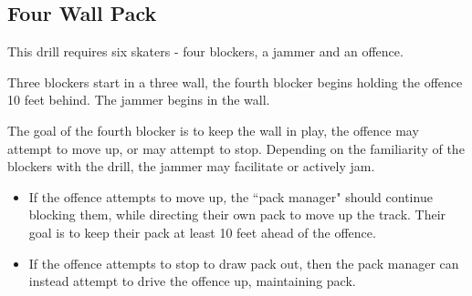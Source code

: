 \subsection*{Four Wall Pack}
\label{drill:four_wall/pack}

This drill requires six skaters - four blockers, a jammer and an offence.

Three blockers start in a three wall, the fourth blocker begins holding the offence 10 feet behind.
The jammer begins in the wall. 


The goal of the fourth blocker is to keep the wall in play, the offence may attempt to move up, or may attempt to stop.
Depending on the familiarity of the blockers with the drill, the jammer may facilitate or actively jam.

\begin{itemize}
\item If the offence attempts to move up, the ``pack manager" should continue blocking them, while directing their own pack to move up the track. Their goal is to keep their pack at least 10 feet ahead of the offence.
\item If the offence attempts to stop to draw pack out, then the pack manager can instead attempt to drive the offence up, maintaining pack.
\end{itemize}


